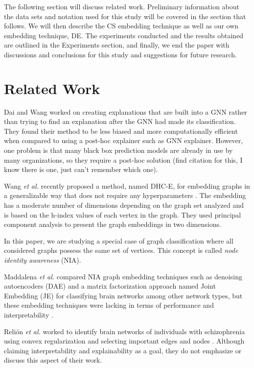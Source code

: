 \documentclass[sigconf]{acmart}
\begin{document}
The following section will discuss related work.
Preliminary information about the data sets and notation used for this study will be covered in the section that follows.
We will then describe the CS embedding technique as well as our own embedding technique, DE.
The experiments conducted and the results obtained are outlined in the Experiments section, and finally, we end the paper with discussions and conclusions for this study and suggestions for future research.



\section{Related Work}


Dai and Wang worked on creating explanations that are built into a GNN \cite{dai2021} rather than trying to find an explanation after the GNN had made its classification.
They found their method to be less biased and more computationally efficient when compared to using a post-hoc explainer such as GNN explainer.
However, one problem is that many black box prediction models are already in use by many organizations, so they require a post-hoc solution (find citation for this, I know there is one, just can't remember which one).

Wang \emph{et al.} recently proposed a method, named DHC-E, for embedding graphs in a generalizable way that does not require any hyperparameters \cite{hwang2021}. The embedding has a moderate number of dimensions depending on the graph set analyzed and is based on the h-index values of each vertex in the graph. They used principal component analysis to present the graph embeddings in two dimensions.

In this paper, we are studying a special case of graph classification where all considered graphs possess the same set of vertices.
This concept is called \emph{node identity awareness} (NIA).

Maddalena \emph{et al.} compared NIA graph embedding techniques such as denoising autoencoders (DAE) \cite{gutierrez2019} and a matrix factorization approach named Joint Embedding (JE) \cite{swang2021} for classifying brain networks among other network types, but these embedding techniques were lacking in terms of performance and interpretability \cite{maddalena2021}.

Reli{\'o}n \emph{et al.} worked to identify brain networks of individuals with schizophrenia using convex regularization and selecting important edges and nodes \cite{relion2019}. Although claiming interpretability and explainability as a goal, they do not emphasize or discuss this aspect of their work.
\end{document}
